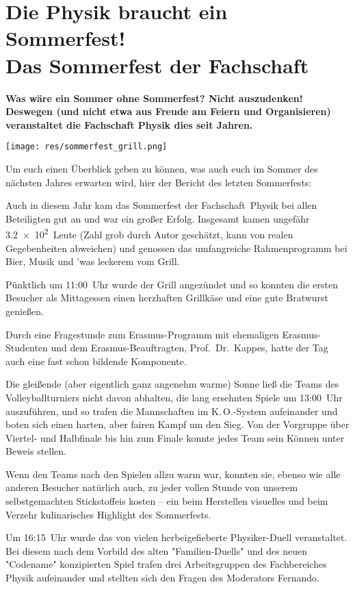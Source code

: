 \section[Das Sommerfest der Fachschaft]{Die Physik braucht ein Sommerfest!\\Das Sommerfest der Fachschaft}
\begin{multicols}{2}

\textbf{Was wäre ein Sommer ohne Sommerfest?
	Nicht auszudenken!
	Deswegen (und nicht etwa aus Freude am Feiern und Organisieren) veranstaltet die Fachschaft Physik dies seit Jahren.}

\texttt{[image: res/sommerfest\_grill.png]}

Um euch einen Überblick geben zu können, was auch euch im Sommer des nächsten Jahres erwarten wird, hier der Bericht des letzten Sommerfests:

Auch in diesem Jahr kam das Sommerfest der Fachschaft~Physik bei allen Beteiligten gut an und war ein großer Erfolg.
Insgesamt kamen ungefähr \num{3,2e2}~Leute (Zahl grob durch Autor geschätzt, kann von realen Gegebenheiten abweichen) und genossen das umfangreiche Rahmenprogramm bei Bier, Musik und 'was leckerem vom Grill.

Pünktlich um 11:00~Uhr wurde der Grill angezündet und so konnten die ersten Besucher als Mittagessen einen herzhaften Grillkäse und eine gute Bratwurst genießen.

Durch eine Fragestunde zum Erasmus-Programm mit ehemaligen Erasmus-Studenten und dem Erasmus-Beauftragten, Prof.\ Dr.\ Kappes, hatte der Tag auch eine fast schon bildende Komponente.

Die gleißende (aber eigentlich ganz angenehm warme) Sonne ließ die Teams des Volleyballturniers nicht davon abhalten, die lang ersehnten Spiele um 13:00~Uhr auszuführen, und so trafen die Mannschaften im K.\,O.-System aufeinander und boten sich einen harten, aber fairen Kampf um den Sieg.
Von der Vorgruppe über Viertel- und Halbfinale bis hin zum Finale konnte jedes Team sein Können unter Beweis stellen.

Wenn den Teams nach den Spielen allzu warm war, konnten sie, ebenso wie alle anderen Besucher natürlich auch, zu jeder vollen Stunde von unserem selbstgemachten Stickstoffeis kosten -- ein beim Herstellen visuelles und beim Verzehr kulinarisches Highlight des Sommerfests. 

Um 16:15~Uhr wurde das von vielen herbeigefieberte Physiker-Duell veranstaltet.
Bei diesem nach dem Vorbild des alten "Familien-Duells" und des neuen "Codename" konzipierten Spiel trafen drei Arbeitsgruppen des Fachbereiches Physik aufeinander und stellten sich den Fragen des Moderators Fernando.


\end{multicols}
